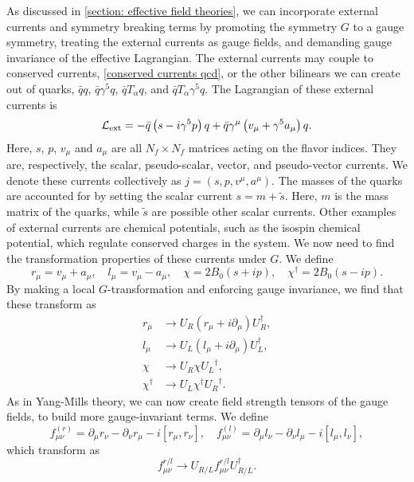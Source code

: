 As discussed in \autoref{section: effective field theories}, we can incorporate external currents and symmetry breaking terms by promoting the symmetry $G$ to a gauge symmetry, treating the external currents as gauge fields, and demanding gauge invariance of the effective Lagrangian.
The external currents may couple to conserved currents, \autoref{conserved currents qcd}, or the other bilinears we can create out of quarks, $\bar q q$, $\bar q\gamma^5 q$, $\bar q T_\alpha q$, and $\bar q T_\alpha \gamma^5 q$.
The Lagrangian of these external currents is
%
\begin{align}
    \mathcal{L}_{\text{ext}}
    = - \bar q \left(s - i \gamma^5 p \right) q
    + \bar q \gamma^\mu  \left(v_\mu + \gamma^5 a_\mu\right)q.
\end{align}
%
Here, $s$, $p$, $v_\mu$ and $a_\mu$ are all $N_f\times N_f$ matrices acting on the flavor indices.
They are, respectively, the scalar, pseudo-scalar, vector, and pseudo-vector currents.
We denote these currents collectively as $j = (s, p, v^\mu, a^\mu)$.
The masses of the quarks are accounted for by setting the scalar current $s = m + \tilde s$.
Here, $m$ is the mass matrix of the quarks, while $\tilde s$ are possible other scalar currents.
Other examples of external currents are chemical potentials, such as the isospin chemical potential, which regulate conserved charges in the system.
We now need to find the transformation properties of these currents under $G$.
We define
%
\begin{equation}
    r_\mu = v_\mu + a_\mu, \quad l_\mu = v_\mu - a_\mu, \quad  
    \chi = 2 B_0 (s +ip), \quad
    \chi^\dagger = 2 B_0(s - ip).
\end{equation}
%
By making a local $G$-transformation and enforcing gauge invariance, we find that these transform as
%
\begin{align}
    r_\mu &\rightarrow U_R (r_\mu + i\partial_\mu) U_R^\dagger, \\
    l_\mu &\rightarrow U_L (l_\mu + i\partial_\mu) U_L^\dagger, \\
    \chi &\rightarrow U_R \chi {U_L}^\dagger, \\
    \chi^\dagger &\rightarrow U_L \chi^\dagger {U_R}^\dagger.
\end{align}
%
As in Yang-Mills theory, we can now create field strength tensors of the gauge fields, to build more gauge-invariant terms.
We define
%
\begin{equation}
    f_{\mu \nu}^{(r)} 
    = 
    \partial_\mu r_\nu - \partial_\nu r_\mu - i[r_\mu, r_\nu], 
    \quad f_{\mu \nu}^{(l)} 
    = \partial_\mu l_\nu - \partial_\nu l_\mu - i[l_\mu, l_\nu],
\end{equation}
%
which transform as 
%
\begin{equation}
    f^{r/l}_{\mu\nu} \rightarrow U_{R/L}  f^{r/l}_{\mu\nu}  U_{R/L}^\dagger.
\end{equation}

